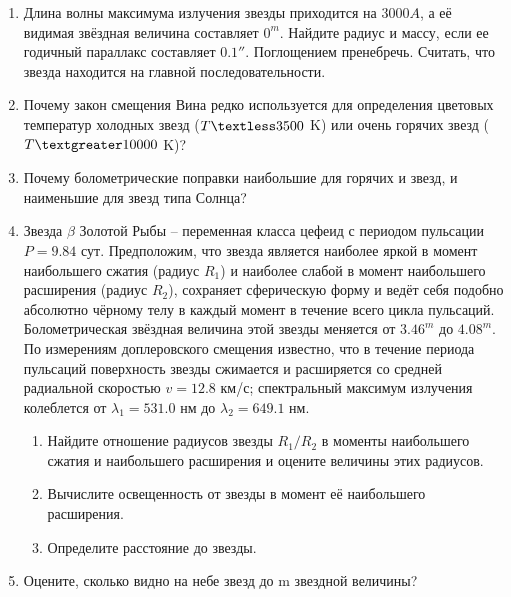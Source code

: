 \documentclass[12pt]{article}
\begin{document}
\begin{enumerate}
    \item Длина волны максимума излучения звезды приходится на $3000A$, а её видимая звёздная величина составляет $0^m$. Найдите радиус и массу, если ее годичный параллакс составляет $0.1''$. Поглощением пренебречь. Считать, что звезда находится на главной последовательности.
    \item Почему закон смещения Вина редко используется для определения цветовых температур холодных звезд ($T \textless 3500$ K) или очень горячих звезд ($T \textgreater 10000$ K)?
    \item Почему болометрические поправки наибольшие для горячих и звезд, и наименьшие для звезд типа Солнца?

    \item Звезда $\beta$ Золотой Рыбы -- переменная класса цефеид с периодом пульсации $P = 9.84$ сут. Предположим, что звезда является наиболее яркой в момент наибольшего сжатия (радиус $R_1$) и наиболее слабой в момент наибольшего расширения (радиус $R_2$), сохраняет сферическую форму и ведёт себя подобно абсолютно чёрному телу в каждый момент в течение всего цикла пульсаций. Болометрическая звёздная величина этой звезды меняется от $3.46^m$ до $4.08^m$. По измерениям доплеровского смещения известно, что в течение периода пульсаций поверхность звезды сжимается и расширяется со средней радиальной скоростью $v = 12.8$ км/с; спектральный максимум излучения колеблется от $\lambda_1 = 531.0$ нм до $\lambda_2 = 649.1$ нм.
    \begin{enumerate}
        \item Найдите отношение радиусов звезды $R_1/R_2$ в моменты наибольшего сжатия и наибольшего расширения и оцените величины этих радиусов.
        \item Вычислите освещенность от звезды в момент её наибольшего расширения.
        \item Определите расстояние до звезды.
    \end{enumerate}

    \item Оцените, сколько видно на небе звезд до m звездной величины?
\end{enumerate}
\end{document}
